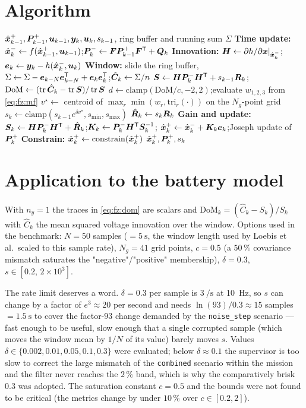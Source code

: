 \section{Algorithm}
\begin{algorithm}[H]
\caption{Fuzzy-AKF --- one sampling period}
\begin{algorithmic}[1]
\Require $\hat{\bm{x}}^{+}_{k-1},\bm{P}^{+}_{k-1},\bm{u}_{k-1},\bm{y}_k,\bm{u}_k,s_{k-1}$, ring buffer and running sum $\Sigma$
\State \textbf{Time update:} $\hat{\bm{x}}^{-}_k\gets f(\hat{\bm{x}}^{+}_{k-1},\bm{u}_{k-1})$;\quad $\bm{P}^{-}_k\gets\bm{F}\bm{P}^{+}_{k-1}\bm{F}^{\mathsf{T}}+\bm{Q}_k$
\State \textbf{Innovation:} $\bm{H}\gets\partial h/\partial\bm{x}|_{\hat{\bm{x}}^{-}_k}$;\quad $\bm{e}_k\gets\bm{y}_k-h(\hat{\bm{x}}^{-}_k,\bm{u}_k)$
\State \textbf{Window:} slide the ring buffer, $\Sigma\gets\Sigma-\bm{e}_{k-N}\bm{e}_{k-N}^{\mathsf{T}}+\bm{e}_k\bm{e}_k^{\mathsf{T}}$;\quad $\hat{\bm{C}}_k\gets\Sigma/n$
  \State $\bm{S}\gets\bm{H}\bm{P}^{-}_k\bm{H}^{\mathsf{T}}+s_{k-1}\bm{R}_k$;\quad $\mathrm{DoM}\gets(\operatorname{tr}\hat{\bm{C}}_k-\operatorname{tr}\bm{S})/\operatorname{tr}\bm{S}$
  \State $d\gets\mathrm{clamp}(\mathrm{DoM}/c,-2,2)$;\quad evaluate $w_{1,2,3}$ from \eqref{eq:fz:mf}
  \State $v^\star\gets$ centroid of $\max_r\min(w_r,\mathrm{tri}_r(\cdot))$ on the $N_g$-point grid
  \State $s_k\gets\mathrm{clamp}(s_{k-1}e^{\delta v^\star},s_{\min},s_{\max})$
\EndIf
\State $\hat{\bm{R}}_k\gets s_k\bm{R}_k$
\State \textbf{Gain and update:} $\bm{S}_k\gets\bm{H}\bm{P}^{-}_k\bm{H}^{\mathsf{T}}+\hat{\bm{R}}_k$;\quad $\bm{K}_k\gets\bm{P}^{-}_k\bm{H}^{\mathsf{T}}\bm{S}_k^{-1}$;\quad
       $\hat{\bm{x}}^{+}_k\gets\hat{\bm{x}}^{-}_k+\bm{K}_k\bm{e}_k$;\quad Joseph update of $\bm{P}^{+}_k$
\State \textbf{Constrain:} $\hat{\bm{x}}^{+}_k\gets\mathrm{constrain}(\hat{\bm{x}}^{+}_k)$
\Ensure $\hat{\bm{x}}^{+}_k,\bm{P}^{+}_k,s_k$
\end{algorithmic}
\end{algorithm}

\section{Application to the battery model}
With $n_y=1$ the traces in \eqref{eq:fz:dom} are scalars and
$\mathrm{DoM}_k = (\hat C_k - S_k)/S_k$ with $\hat C_k$ the mean squared voltage innovation over the
window.  Options used in the benchmark: $N=50$ samples ($=\SI{5}{\second}$, the window length used
by Loebis et al.\ scaled to this sample rate), $N_g=41$ grid points, $c=0.5$ (a $50\,\%$ covariance
mismatch saturates the "negative"/"positive" membership), $\delta=0.3$, $s\in[0.2,\,2\times10^3]$.

The rate limit deserves a word.  $\delta=0.3$ per sample is $\SI{3}{\per\second}$ at
\SI{10}{\hertz}, so $s$ can change by a factor of $e^3\approx20$ per second and needs
$\ln(93)/0.3\approx15$ samples $=\SI{1.5}{\second}$ to cover the factor-$93$ change demanded by the
\texttt{noise\_step} scenario --- fast enough to be useful, slow enough that a single corrupted
sample (which moves the window mean by $1/N$ of its value) barely moves $s$.  Values
$\delta\in\{0.002,0.01,0.05,0.1,0.3\}$ were evaluated; below $\delta\approx0.1$ the supervisor is too
slow to correct the large mismatch of the \texttt{combined} scenario within the mission and the
filter never reaches the $2\,\%$ band, which is why the comparatively brisk $0.3$ was adopted.  The
saturation constant $c=0.5$ and the bounds were not found to be critical (the metrics change by
under $10\,\%$ over $c\in[0.2,2]$).

